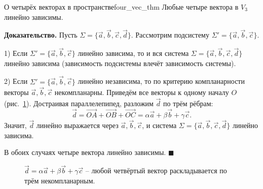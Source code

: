 \documentclass[12pt,a4paper]{article}
\newenvironment{myproof}{\noindent\textbf{Доказательство.}}{\hfill$\blacksquare$}
\begin{document}
\begin{theorem}{О четырёх векторах в пространстве}{four_vec_thm}
  Любые четыре вектора в $V_3$ линейно зависимы.
\end{theorem}

\begin{myproof}
  Пусть $\Sigma = \{\vec{a}, \vec{b}, \vec{c}, \vec{d}\}$. Рассмотрим
  подсистему $\Sigma' = \{\vec{a}, \vec{b}, \vec{c}\}$.

1) Если $\Sigma' = \{\vec{a}, \vec{b}, \vec{c}\}$ линейно зависима, то и
вся система $\Sigma = \{\vec{a}, \vec{b}, \vec{c}, \vec{d}\}$ линейно
зависима (зависимость подсистемы влечёт зависимость системы).

2) Если $\Sigma' = \{\vec{a}, \vec{b}, \vec{c}\}$ линейно независима, то
по критерию компланарности векторы $\vec{a}, \vec{b}, \vec{c}$
некомпланарны. Приведём все векторы к одному началу $O$
(рис.~\ref{fig:four}). Достраивая параллелепипед, разложим $\vec{d}$ по
трём рёбрам:
\[
\vec{d} = \overrightarrow{OA} + \overrightarrow{OB} +
\overrightarrow{OC} = \alpha\vec{a} + \beta\vec{b} + \gamma\vec{c}.
\]
Значит, $\vec{d}$ линейно выражается через $\vec{a}, \vec{b}, \vec{c}$,
и система $\Sigma = \{\vec{a}, \vec{b}, \vec{c}, \vec{d}\}$ линейно
зависима.

В обоих случаях четыре вектора линейно зависимы.
\end{myproof}

\begin{figure}[h!]
\centering
{}
\caption{$\vec{d} = \alpha\vec{a} + \beta\vec{b} + \gamma\vec{c}$ --
любой четвёртый вектор раскладывается по трём некомпланарным.}
\label{fig:four}
\end{figure}
\end{document}
